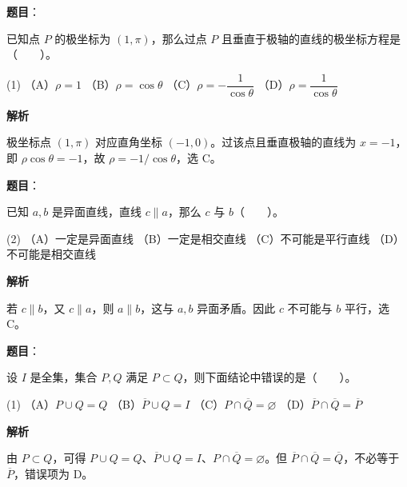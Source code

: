 \begin{answer}

\textbf{题目}：

已知点 \(P\) 的极坐标为 \((1,\pi)\)，那么过点 \(P\) 且垂直于极轴的直线的极坐标方程是\mbox{（　　）}。

\begin{gkopts}(1)
\task （A）\(\rho=1\)
\task （B）\(\rho=\cos\theta\)
\task （C）\(\rho=-\dfrac1{\cos\theta}\)
\task （D）\(\rho=\dfrac1{\cos\theta}\)
\end{gkopts}

\textbf{解析}

极坐标点 \((1,\pi)\) 对应直角坐标 \((-1,0)\)。过该点且垂直极轴的直线为 \(x=-1\)，即 \(\rho\cos\theta=-1\)，故 \(\rho=-1/\cos\theta\)，选 C。


\end{answer}
\begin{answer}

\textbf{题目}：

已知 \(a,b\) 是异面直线，直线 \(c\parallel a\)，那么 \(c\) 与 \(b\)\mbox{（　　）}。

\begin{gkopts}(2)
\task （A）一定是异面直线
\task （B）一定是相交直线
\task （C）不可能是平行直线
\task （D）不可能是相交直线
\end{gkopts}

\textbf{解析}

若 \(c\parallel b\)，又 \(c\parallel a\)，则 \(a\parallel b\)，这与 \(a,b\) 异面矛盾。因此 \(c\) 不可能与 \(b\) 平行，选 C。


\end{answer}
\begin{answer}

\textbf{题目}：

设 \(I\) 是全集，集合 \(P,Q\) 满足 \(P\subset Q\)，则下面结论中错误的是\mbox{（　　）}。

\begin{gkopts}(1)
\task （A）\(P\cup Q=Q\)
\task （B）\(\overline P\cup Q=I\)
\task （C）\(P\cap\overline Q=\varnothing\)
\task （D）\(\overline P\cap\overline Q=\overline P\)
\end{gkopts}

\textbf{解析}

由 \(P\subset Q\)，可得 \(P\cup Q=Q\)、\(\overline P\cup Q=I\)、\(P\cap\overline Q=\varnothing\)。但 \(\overline P\cap\overline Q=\overline Q\)，不必等于 \(\overline P\)，错误项为 D。


\end{answer}
